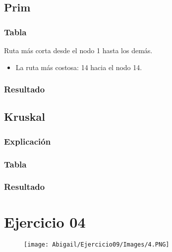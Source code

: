 \documentclass[12pt]{article}
\begin{document}
    \subsection{Prim}

      \subsubsection{Tabla}

        Ruta más corta desde el nodo 1 hasta los demás.

        \begin{itemize}
          \item La ruta más costosa: 14 hacia el nodo 14.
        \end{itemize}

      \subsubsection{Resultado}

    \subsection{Kruskal}

      \subsubsection{Explicación}

      \subsubsection{Tabla}

      \subsubsection{Resultado}

  
  \section{Ejercicio 04}

    \begin{figure}[h!]
      \centering
      \texttt{[image: Abigail/Ejercicio09/Images/4.PNG]}
    \end{figure} 
\end{document}
